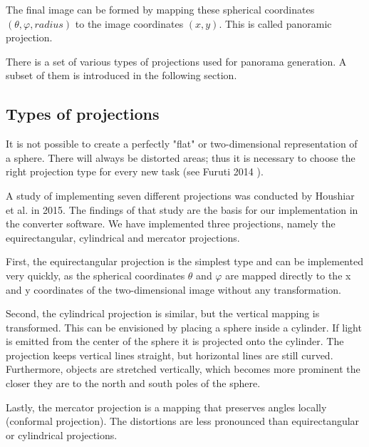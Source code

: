 The final image can be formed by mapping these spherical coordinates {$(\theta, \varphi, radius)$} to the image coordinates {$(x, y)$}. This is called panoramic projection.

There is a set of various types of projections used for panorama generation. A subset of them is introduced in the following section.

\subsection{Types of projections} \label{section_types_of_projections}

It is not possible to create a perfectly "flat" or two-dimensional representation of a sphere. There will always be distorted areas; thus it is necessary to choose the right projection type for every new task (see Furuti 2014 \parencite{panoramaProblem} ).

A study of implementing seven different projections was conducted by Houshiar et al. \parencite{houshiar2015a} in 2015. The findings of that study are the basis for our implementation in the converter software. We have implemented three projections, namely the equirectangular, cylindrical and mercator projections.

First, the equirectangular projection is the simplest type and can be implemented very quickly, as the spherical coordinates {$\theta$} and {$\varphi$} are mapped directly to the x and y coordinates of the two-dimensional image without any transformation.

Second, the cylindrical projection is similar, but the vertical mapping is transformed. This can be envisioned by placing a sphere inside a cylinder. If light is emitted from the center of the sphere it is projected onto the cylinder. The projection keeps vertical lines straight, but horizontal lines are still curved. Furthermore, objects are stretched vertically, which becomes more prominent the closer they are to the north and south poles of the sphere.

Lastly, the mercator projection is a mapping that preserves angles locally (conformal projection). The distortions are less pronounced than equirectangular or cylindrical projections.

